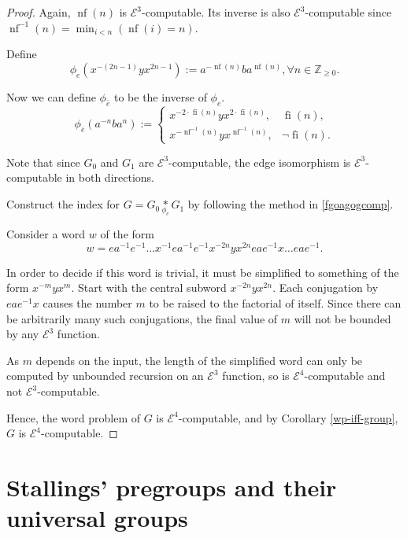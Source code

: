 \documentclass[a4paper]{article}
\newcommand{\grz}[1]{$\mathcal{E}^{#1}$}	%
\newcommand{\ZZ}{\mathbb{Z}}
\theoremstyle{plain}
\theoremstyle{definition}
\begin{document}
\begin{proof}
Again, $\operatorname{nf}(n)$ is \grz{3}-computable. Its inverse is also \grz{3}-computable since $\operatorname{nf}^{-1}(n) = \min_{i<n} (\operatorname{nf}(i) = n)$.

Define
\[ \phi_{e}(x^{-(2n-1)}yx^{2n-1}) := a^{-\operatorname{nf}(n)}ba^{\operatorname{nf}(n)}, \forall n \in \ZZ_{\geq 0}. \]

Now we can define $\phi_{\bar{e}}$ to be the inverse of $\phi_e$.
\[ 
	\phi_{\bar{e}}(a^{-n}ba^n) := 
		\begin{cases}
			x^{-2 \cdot \operatorname{fi}(n)}yx^{2 \cdot \operatorname{fi}(n)}, & \operatorname{fi}(n), \\
			x^{-\operatorname{nf}^{-1}(n)}yx^{\operatorname{nf}^{-1}(n)}, & \neg \operatorname{fi}(n).
		\end{cases}
\]

Note that since $G_0$ and $G_1$ are \grz{3}-computable, the edge isomorphism is \grz{3}-computable in both directions.

Construct the index for $G = G_0 \underset{\phi_e}{\ast} G_1$ by following the method in \ref{fgoagogcomp}.

Consider a word $w$ of the form
\[ w = ea^{-1}e^{-1} \dots x^{-1}ea^{-1}e^{-1}x^{-2n}yx^{2n}eae^{-1}x \dots eae^{-1}. \]

In order to decide if this word is trivial, it must be simplified to something of the form $x^{-m}yx^m$. Start with the central subword $x^{-2n}yx^{2n}$. Each conjugation by $eae^{-1}x$ causes the number $m$ to be raised to the factorial of itself. Since there can be arbitrarily many such conjugations, the final value of $m$ will not be bounded by any \grz{3} function.

As $m$ depends on the input, the length of the simplified word can only be computed by unbounded recursion on an \grz{3} function, so is \grz{4}-computable and not \grz{3}-computable. 

Hence, the word problem of $G$ is \grz{4}-computable, and by Corollary \ref{wp-iff-group}, $G$ is \grz{4}-computable. 
\end{proof}

\section{Stallings' pregroups and their universal groups}
\label{sec:pregroup}
\end{document}
